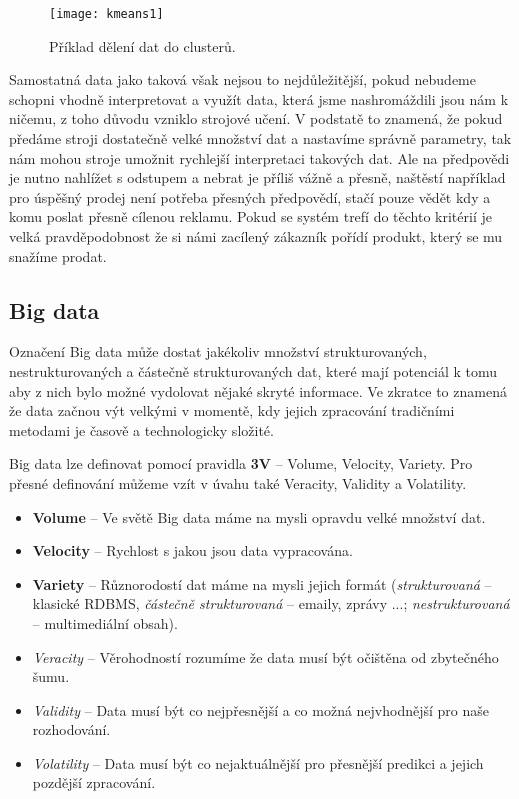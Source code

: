 \begin{figure}[htp]
\centering
\texttt{[image: kmeans1]}
\caption{Příklad dělení dat do clusterů.}
\label{cluster-fig}
\end{figure}

\par Samostatná data jako taková však nejsou to nejdůležitější, pokud nebudeme schopni vhodně interpretovat a využít data, která jsme nashromáždili jsou nám k ničemu, z toho důvodu vzniklo strojové učení. V podstatě to znamená, že pokud předáme stroji dostatečně velké množství dat a nastavíme správně parametry, tak nám mohou stroje umožnit rychlejší interpretaci takových dat. Ale na předpovědi je nutno nahlížet s odstupem a nebrat je příliš vážně a přesně, naštěstí například pro úspěšný prodej není potřeba přesných předpovědí, stačí pouze vědět kdy a komu poslat přesně cílenou reklamu. Pokud se systém trefí do těchto kritérií je velká pravděpodobnost že si námi zacílený zákazník pořídí produkt, který se mu snažíme prodat. \cite{predictive-analytics}

\subsection{Big data} \label{big-data}
Označení Big data může dostat jakékoliv množství strukturovaných, nestrukturovaných a částečně strukturovaných dat, které mají potenciál k tomu aby z nich bylo možné vydolovat nějaké skryté informace. Ve zkratce to znamená že data začnou výt velkými v momentě, kdy jejich zpracování tradičními metodami je časově a technologicky složité.\cite{big-data-anayitics}

\par Big data lze definovat pomocí pravidla \textbf{3V} -- Volume, Velocity, Variety. Pro přesné definování můžeme vzít v úvahu také Veracity, Validity a Volatility.\cite{big-data-anayitics}
\begin{itemize}
\item \textbf{Volume} -- Ve světě Big data máme na mysli opravdu velké množství dat.
\item \textbf{Velocity} -- Rychlost s jakou jsou data vypracována.
\item \textbf{Variety} -- Různorodostí dat máme na mysli jejich formát (\textit{strukturovaná} -- klasické RDBMS, \textit{částečně strukturovaná} -- emaily, zprávy ...; \textit{nestrukturovaná} -- multimediální obsah).
\item \textit{Veracity} -- Věrohodností rozumíme že data musí být očištěna od zbytečného šumu.
\item \textit{Validity} -- Data musí být co nejpřesnější a co možná nejvhodnější pro naše rozhodování.
\item \textit{Volatility} -- Data musí být co nejaktuálnější pro přesnější predikci a jejich pozdější zpracování. \cite{big-data-anayitics}
\end{itemize}

